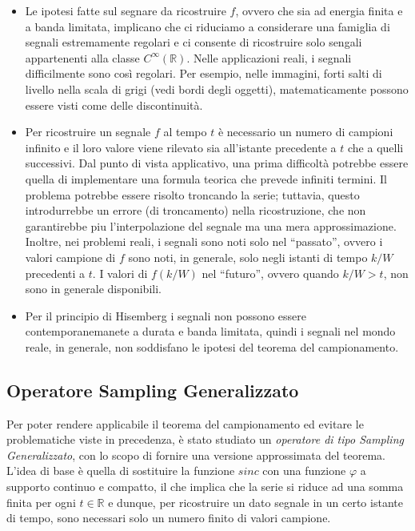 \begin{itemize}
    \item Le ipotesi fatte sul segnare da ricostruire $f$, ovvero che sia ad energia finita
          e a banda limitata, implicano che ci riduciamo a considerare una famiglia di segnali
          estremamente regolari e ci consente di ricostruire solo sengali appartenenti alla classe
          $C^{\infty}(\mathbb{R})$. Nelle applicazioni reali, i segnali difficilmente sono così
          regolari. Per esempio, nelle immagini, forti salti di livello nella scala di grigi
          (vedi bordi degli oggetti), matematicamente possono essere visti come delle
          discontinuità.
    \item Per ricostruire un segnale $f$ al tempo $t$ è necessario un numero di campioni infinito
          e il loro valore viene rilevato sia all'istante precedente a $t$ che a quelli successivi.
          Dal punto di vista applicativo, una prima difficoltà potrebbe essere quella di
          implementare una formula teorica che prevede infiniti termini.
          Il problema potrebbe essere risolto troncando la serie; tuttavia, questo introdurrebbe
          un errore (di troncamento) nella ricostruzione, che non garantirebbe piu
          l’interpolazione del segnale ma una mera approssimazione.
          Inoltre, nei problemi reali, i segnali sono noti solo nel “passato”, ovvero i
          valori campione di $f$ sono noti, in generale, solo negli istanti di tempo $k/W$
          precedenti a $t$. I valori di $f(k/W)$ nel “futuro”, ovvero quando $k/W > t$,
          non sono in generale disponibili.
    \item Per il principio di Hisemberg i segnali non possono essere contemporanemanete
          a durata e banda limitata, quindi i segnali nel mondo reale, in generale, non soddisfano
          le ipotesi del teorema del campionamento.
\end{itemize}

\subsection{Operatore Sampling Generalizzato}

Per poter rendere applicabile il teorema del campionamento ed evitare le
problematiche viste in precedenza, è stato studiato un \textit{operatore di tipo
    Sampling Generalizzato}, con lo scopo di fornire una versione approssimata del
teorema. L'idea di base è quella di sostituire la funzione $sinc$ con una
funzione $\varphi$ a supporto continuo e compatto, il che implica che la serie
si riduce ad una somma finita per ogni $t \in \mathbb{R}$ e dunque, per ricostruire
un dato segnale in un certo istante di tempo, sono necessari solo un numero
finito di valori campione.\\

